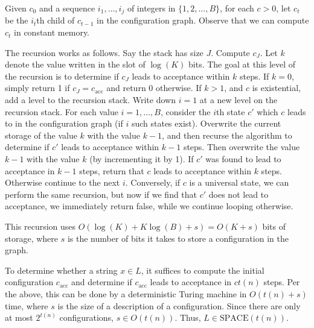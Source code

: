 \documentclass{article}
\begin{document}
Given $c_0$ and a sequence $i_1, \dots, i_j$ of integers in $\{1, 2, \dots, B\}$, for each $c > 0$, let $c_t$ be the $i_t$th child of $c_{t - 1}$ in the configuration graph.  Observe that we can compute $c_t$ in constant memory.

The recursion works as follows.  Say the stack has size $J$.  Compute $c_J$.  Let $k$ denote the value written in the slot of $\log(K)$ bits.  The goal at this level of the recursion is to determine if $c_J$ leads to acceptance within $k$ steps.  If $k = 0$, simply return 1 if $c_J = c_\text{acc}$ and return 0 otherwise.  If $k > 1$, and $c$ is existential, add a level to the recursion stack.  Write down $i = 1$ at a new level on the recursion stack.  For each value $i = 1, \dots, B$, consider the $i$th state $c'$ which $c$ leads to in the configuration graph (if $i$ such states exist).  Overwrite the current storage of the value $k$ with the value $k - 1$, and then recurse the algorithm to determine if $c'$ leads to acceptance within $k - 1$ steps. Then overwrite the value $k - 1$ with the value $k$ (by incrementing it by 1).  If $c'$ was found to lead to acceptance in $k - 1$ steps, return that $c$ leads to acceptance within $k$ steps.  Otherwise continue to the next $i$.  Conversely, if $c$ is a universal state, we can perform the same recursion, but now if we find that $c'$ does not lead to acceptance, we immediately return false, while we continue looping otherwise.

This recursion uses $O(\log(K) + K \log(B) + s) = O(K + s)$ bits of storage, where $s$ is the number of bits it takes to store a configuration in the graph.

To determine whether a string $x \in L$, it suffices to compute the initial configuration $c_\text{acc}$ and determine if $c_\text{acc}$ leads to acceptance in $c t(n)$ steps.  Per the above, this can be done by a deterministic Turing machine in $O(t(n) + s)$ time, where $s$ is the size of a description of a configuration.  Since there are only at most $2^{t(n)}$ configurations, $s \in O(t(n))$.  Thus, $L \in \text{SPACE}(t(n))$.

\end{document}
